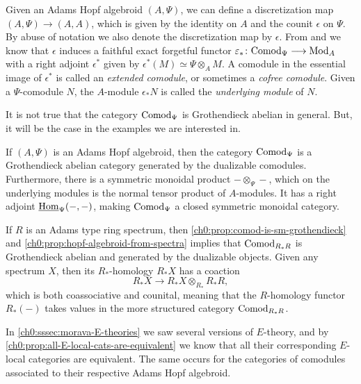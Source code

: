 \begin{construction}
    \label{ch0:const:discretization-adjunction}
    Given an Adams Hopf algebroid $(A, \Psi)$, we can define a discretization map $(A, \Psi)\longrightarrow (A, A)$, which is given by the identity on $A$ and the counit $\epsilon$ on $\Psi$. By abuse of notation we also denote the discretization map by $\epsilon$. From \cite[A1.2.1]{ravenel_86} and \cite[4.6]{barthel-heard-valenzuela_2018} we know that $\epsilon$ induces a faithful exact forgetful functor $\varepsilon_* \colon \mathrm{Comod}_\Psi \longrightarrow \mathrm{Mod}_A$ with a right adjoint $\epsilon^*$ given by $\epsilon^*(M)\simeq \Psi\otimes_A M$. A comodule in the essential image of $\epsilon^*$ is called an \emph{extended comodule}, or sometimes a \emph{cofree comodule}. Given a $\Psi$-comodule $N$, the $A$-module $\epsilon_* N$ is called the \emph{underlying module} of $N$.  
\end{construction}

It is not true that the category $\mathrm{Comod}_\Psi$ is Grothendieck abelian in general. But, it will be the case in the examples we are interested in. 

\begin{proposition}
    \label{ch0:prop:comod-is-sm-grothendieck}
    If $(A,\Psi)$ is an Adams Hopf algebroid, then the category $\mathrm{Comod}_\Psi$ is a Grothendieck abelian category generated by the dualizable comodules. Furthermore, there is a symmetric monoidal product $-\otimes_\Psi -$, which on the underlying modules is the normal tensor product of $A$-modules. It has a right adjoint $\operatorname{\underline{Hom}}_\Psi(-,-)$, making $\mathrm{Comod}_\Psi$ a closed symmetric monoidal category. 
\end{proposition}

\begin{example}
    If $R$ is an Adams type ring spectrum, then \cref{ch0:prop:comod-is-sm-grothendieck} and \cref{ch0:prop:hopf-algebroid-from-spectra} implies that $\mathrm{Comod}_{R_*R}$ is Grothendieck abelian and generated by the dualizable objects. Given any spectrum $X$, then its $R_*$-homology $R_*X$ has a coaction 
    \[R_*X \to R_*X \otimes_{R_*} R_*R,\]
    which is both coassociative and counital, meaning that the $R$-homology functor $R_*(-)$ takes values in the more structured category $\mathrm{Comod}_{R_*R}$. 
\end{example}

In \cref{ch0:sssec:morava-E-theories} we saw several versions of $E$-theory, and by \cref{ch0:prop:all-E-local-cats-are-equivalent} we know that all their corresponding $E$-local categories are equivalent. The same occurs for the categories of comodules associated to their respective Adams Hopf algebroid.

